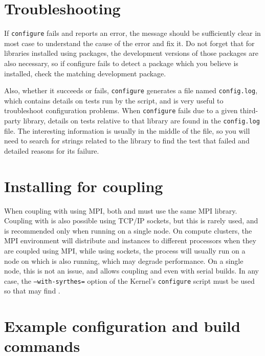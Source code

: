 \documentclass[a4paper,10pt,twoside]{article}
\begin{document}
\section{Troubleshooting\label{sec:config:troubleshoot}}

If \texttt{configure} fails and reports an error, the message should
be sufficiently clear in most case to understand the cause of the
error and fix it. Do not forget that for libraries installed using
packages, the development versions of those packages are also
necessary, so if configure fails to detect a package which you
believe is installed, check the matching development package.

Also, whether it succeeds or fails, \texttt{configure} generates
a file named \texttt{config.log}, which contains details on tests
run by the script, and is very useful to troubleshoot
configuration problems. When \texttt{configure} fails due to a given
third-party library, details on tests relative to that library
are found in the \texttt{config.log} file. The interesting information
is usually in the middle of the file, so you will need to search
for strings related to the library to find the test that failed
and detailed reasons for its failure.

\section{Installing for \syrthes coupling\label{sec:syrthes}}

When coupling with \syrthes using MPI, both \CS and \syrthes must
use the same MPI library. Coupling with \syrthes is also possible
using TCP/IP sockets, but this is rarely used, and is recommended only
when running on a single node. On compute clusters, the MPI environment
will distribute \syrthes and \CS instances to different processors when
they are coupled using MPI, while using sockets, the \syrthes process will
usually run on a node on which \CS is also running, which may degrade
performance. On a single node, this is not an issue, and allows coupling
\CS and \syrthes even with serial builds.
In any case, the \texttt{--with-syrthes=} option of the
Kernel's \texttt{configure} script must be used so that
\CS may find \syrthes.

\section{Example configuration and build commands\label{sec:config:examples}}
\end{document}
